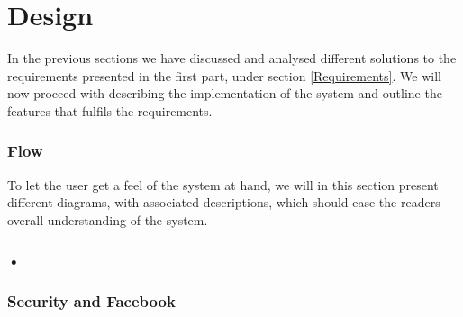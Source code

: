 \part{Design}
In the previous sections we have discussed and analysed different solutions to the requirements presented in the first part, under section \ref{Requirements}. We will now proceed with describing the implementation of the system and outline the features that fulfils the requirements.

\section{Flow}
To let the user get a feel of the system at hand, we will in this section present different diagrams, with associated descriptions, which should ease the readers overall understanding of the system. 

\section{•}


\section{Security and Facebook}

